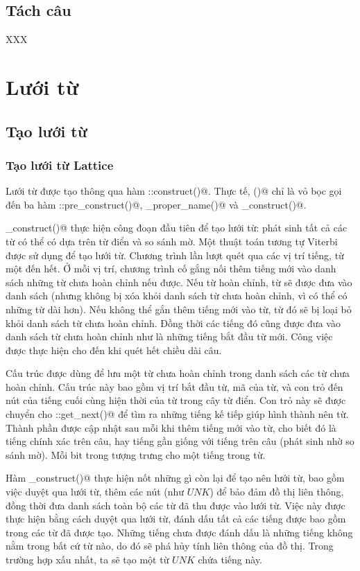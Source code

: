 \documentclass[a4paper,oneside,14pt]{extbook} %
\begin{document}
\subsection{Tách câu}

XXX%

\section{Lưới từ}

\subsection{Tạo lưới từ}
\subsubsection{Tạo lưới từ Lattice}
Lưới từ \verb@Lattice@ được tạo thông qua hàm
\verb@Lattice::construct()@. Thực tế, \verb@construct()@ chỉ là vỏ bọc
gọi đến ba hàm \verb@Lattice::pre_construct()@,
\verb@mark_proper_name()@ và \verb@post_construct()@.

\verb@pre_construct()@ thực hiện công đoạn đầu tiên để tạo lưới từ:
phát sinh tất cả các từ có thể có dựa trên từ điển và so sánh mờ. Một
thuật toán tương tự Viterbi được sử dụng để tạo lưới từ. Chương trình
lần lượt quét qua các vị trí tiếng, từ một đến hết. Ở mỗi vị trí,
chương trình cố gắng nối thêm tiếng mới vào danh sách những từ chưa
hoàn chỉnh nếu được. Nếu từ hoàn chỉnh, từ sẽ được đưa vào danh sách
(nhưng không bị xóa khỏi danh sách từ chưa hoàn chỉnh, vì có thể có
những từ dài hơn). Nếu không thể gắn thêm tiếng mới vào từ, từ đó sẽ
bị loại bỏ khỏi danh sách từ chưa hoàn chỉnh. Đồng thời các tiếng đó
cũng được đưa vào danh sách từ chưa hoàn chỉnh như là những tiếng bắt
đầu từ mới. Công việc được thực hiện cho đến khi quét hết chiều dài
câu. 

Cấu trúc \verb@WordState@ được dùng để lưu một từ chưa hoàn chỉnh
trong danh sách các từ chưa hoàn chỉnh. Cấu trúc này bao gồm vị trí
bắt đầu từ, mã \verb@fuzid@ của từ, và con trỏ đến nút của tiếng cuối cùng
hiện thời của từ trong cây từ điển. Con trỏ này sẽ được chuyển cho
\verb@WordNode::get_next()@ để tìm ra những tiếng kế tiếp giúp hình
thành nên từ. Thành phần \verb@fuzid@ được cập nhật sau mỗi khi thêm
tiếng mới vào từ, cho biết đó là tiếng chính xác trên câu, hay tiếng
gần giống với tiếng trên câu (phát sinh nhờ so sánh mờ). Mỗi bit trong
\verb@fuzid@ tượng trưng cho một tiếng trong từ.

Hàm \verb@post_construct()@ thực hiện nốt những gì còn lại để tạo nên
lưới từ, bao gồm việc duyệt qua lưới từ, thêm các nút (như $UNK$)
để bảo đảm đồ thị liên thông, đồng thời đưa danh sách toàn bộ các từ
đã thu được vào lưới từ. Việc này được thực hiện bằng cách duyệt qua
lưới từ, đánh dấu tất cả các tiếng được bao gồm trong các từ đã được
tạo. Những tiếng chưa được đánh dấu là những tiếng không nằm trong bất
cứ từ nào, do đó sẽ phá hủy tính liên thông của đồ thị. Trong trường
hợp xấu nhất, ta sẽ tạo một từ $UNK$ chứa tiếng này.
\end{document}
